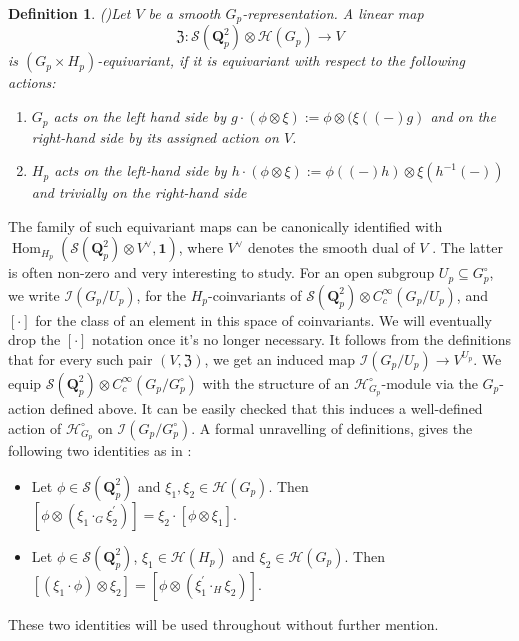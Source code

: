\documentclass{amsart}%
\theoremstyle{plain}
\theoremstyle{plain}
\newtheorem{defn}[thm]{Definition}
\theoremstyle{remark}
\DeclareMathOperator{\Hom}{Hom}
\begin{document}
\begin{defn}\emph{(\cite[Definition $3.1.1$]{Loeffler_2021})}\label{def equiv maps}
    Let $V$ be a smooth $G_p$-representation. A linear map 
    $$\mathfrak{Z}:\mathcal{S}(\mathbf{Q}_p^2)\otimes \mathcal{H}(G_p)\longrightarrow{V}$$
    is $(G_p\times H_p)$-equivariant, if it is equivariant with respect to the following actions: 
\begin{enumerate}
    \item $G_p$ acts on the left hand side by $g\cdot(\phi\otimes\xi):=\phi\otimes(\xi((-)g)$ and on the right-hand side by its assigned action on $V$.
    \item $H_p$ acts on the left-hand side by $h\cdot(\phi\otimes\xi):=\phi((-)h)\otimes\xi(h^{-1}(-))$ and trivially on the right-hand side
\end{enumerate}
    
\end{defn}

\noindent 
The family of such equivariant maps can be canonically identified with $\Hom_{H_p}(\mathcal{S}(\mathbf{Q}_p^2)\otimes V^\vee,\mathbf{1})$, where $V^\vee$ denotes the smooth dual of $V$ \cite[\S $4.9$]{Loeffler_Skinner_Zerbes_2021}. The latter is often non-zero and very interesting to study. For an open subgroup $U_p\subseteq G_p^\circ$, we write $\mathcal{I}(G_p/U_p)$, for the $H_p$-coinvariants of $\mathcal{S}(\mathbf{Q}_p^2)\otimes C_c^\infty(G_p/U_p)$, and $[\cdot]$ for the class of an element in this space of coinvariants. We will eventually drop the $[\cdot]$ notation once it's no longer necessary. It follows from the definitions that for every such pair $(V,\mathfrak{Z})$, we get an induced map $\mathcal{I}(G_p/U_p)\rightarrow V^{U_p}$. We equip $\mathcal{S}(\mathbf{Q}_p^2)\otimes C_c^\infty(G_p/G_p^\circ)$ with the structure of an $\mathcal{H}_{G_p}^\circ$-module via the $G_p$-action defined above. It can be easily checked that this induces a well-defined action of $\mathcal{H}_{G_p}^\circ$ on $\mathcal{I}(G_p/G_p^\circ)$. A formal unravelling of definitions, gives the following two identities as in \cite{Loeffler_2021}: \begin{itemize}
    \item Let $\phi\in \mathcal{S}(\mathbf{Q}_p^2)$ and $\xi_1,\xi_2\in \mathcal{H}(G_p)$. Then
    $[\phi\otimes (\xi_1\cdot_G\xi_2^{'})]=\xi_2\cdot[\phi\otimes \xi_1].$
    \item Let $\phi\in \mathcal{S}(\mathbf{Q}_p^2)$, $\xi_1\in \mathcal{H}(H_p)$ and $\xi_2\in\mathcal{H}(G_p)$. Then
    $[(\xi_1\cdot \phi)\otimes \xi_2]=[\phi\otimes (\xi_1^{'}\cdot_H \xi_2)].$
\end{itemize}
These two identities will be used throughout without further mention. 
\end{document}
